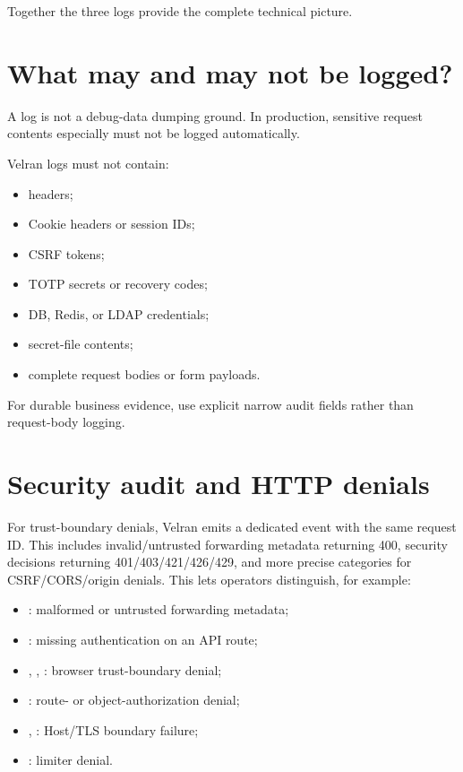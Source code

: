 Together the three logs provide the complete technical picture.

\section{What may and may not be logged?}

A log is not a debug-data dumping ground. In production, sensitive request contents especially must not be logged automatically.

Velran logs must not contain:

\begin{itemize}
  \item {} headers;
  \item Cookie headers or session IDs;
  \item CSRF tokens;
  \item TOTP secrets or recovery codes;
  \item DB, Redis, or LDAP credentials;
  \item secret-file contents;
  \item complete request bodies or form payloads.
\end{itemize}

For durable business evidence, use explicit narrow audit fields rather than request-body logging.

\section{Security audit and HTTP denials}

For trust-boundary denials, Velran emits a dedicated  event with the same request ID. This includes invalid/untrusted forwarding metadata returning 400, security decisions returning 401/403/421/426/429, and more precise categories for CSRF/CORS/origin denials. This lets operators distinguish, for example:

\begin{itemize}
  \item {}: malformed or untrusted forwarding metadata;
  \item {}: missing authentication on an API route;
  \item {}, , : browser trust-boundary denial;
  \item {}: route- or object-authorization denial;
  \item {}, : Host/TLS boundary failure;
  \item {}: limiter denial.
\end{itemize}

